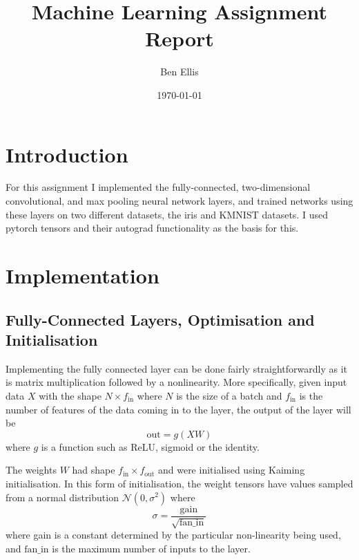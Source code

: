 \documentclass[11pt]{article}
\begin{document}
\title{Machine Learning Assignment Report}
\date{\today}
\author{Ben Ellis}
\maketitle

\section*{Introduction}
For this assignment I implemented the fully-connected, two-dimensional convolutional, and max pooling
neural network layers, and trained networks using these layers on two different datasets, the iris and KMNIST datasets.
I used pytorch tensors and their autograd functionality as the basis for this. 

\section*{Implementation}

\subsection*{Fully-Connected Layers, Optimisation and Initialisation}

Implementing the fully connected layer can be done fairly straightforwardly as it is matrix multiplication followed by a
nonlinearity. More specifically, given input data $X$ with the shape $N \times f_{\text{in}}$ where $N$ is the size of a batch 
and $f_{\text{in}}$ is the number of features of the data coming in to the layer, the output of the layer will be 
\[
    \text{out} = g(XW)
\]
where $g$ is a function such as ReLU, sigmoid or the identity. 

The weights $W$ had shape 
$f_{\text{in}} \times f_{\text{out}}$ and were initialised using Kaiming initialisation. In this form of 
initialisation, the weight tensors have values sampled from a normal distribution $\mathcal{N}(0, \sigma^2)$ where 
\[
    \sigma = \frac{\text{gain}}{\sqrt{\text{fan\_in}}}
\]
where gain is a constant determined by the particular non-linearity being used, and $\text{fan\_in}$ is the maximum
number of inputs to the layer.
\end{document}
